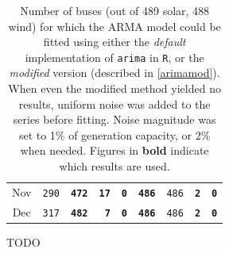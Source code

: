 \documentclass[main.tex]{subfiles}
\begin{document}
\begin{table}[]
\begin{tabular}{c|ccrr|ccrr}
Nov & \texttt{290} & \texttt{\textbf{472}} & \texttt{\textbf{17}} & \texttt{\textbf{0}} & \texttt{\textbf{486}} & \texttt{486} & \texttt{\textbf{2}} & \texttt{\textbf{0}} \\
Dec & \texttt{317} & \texttt{\textbf{482}} & \texttt{\textbf{7}} & \texttt{\textbf{0}} & \texttt{\textbf{486}} & \texttt{486} & \texttt{\textbf{2}} & \texttt{\textbf{0}} \\
\bottomrule
    \end{tabular}%
    \caption{Number of buses (out of 489 solar, 488 wind) for which the ARMA model could be fitted using either the \emph{default} implementation of \texttt{arima} in \texttt{R}, or the \emph{modified} version (described in \ref{arimamod}).
    \newline
    When even the modified method yielded no results, uniform noise was added to the series before fitting. Noise magnitude was set to 1\% of generation capacity, or 2\% when needed.
    \newline
    Figures in \textbf{bold} indicate which results are used.
    }
    \label{tab:arimafitstats}
\end{table}

\begin{table}

\caption{TODO}
\label{tab:top20}
\end{table}

\clearpage
\end{document}

